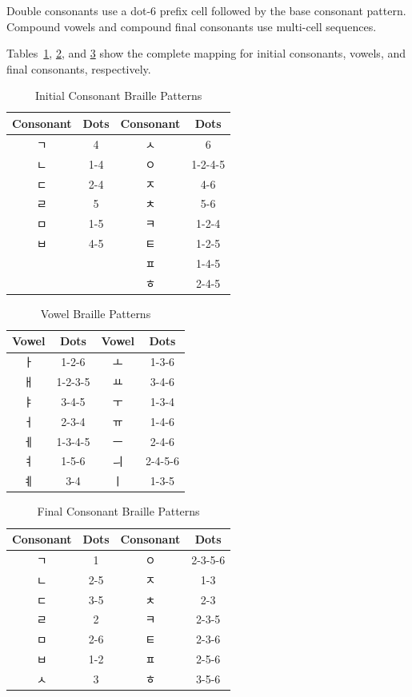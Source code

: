 \documentclass[journal]{IEEEtran}
\begin{document}
Double consonants use a dot-6 prefix cell followed by the base consonant pattern. Compound vowels and compound final consonants use multi-cell sequences.

Tables~\ref{tab:cho}, \ref{tab:jung}, and \ref{tab:jong} show the complete mapping for initial consonants, vowels, and final consonants, respectively.

\begin{table}[h]
\centering
\caption{Initial Consonant Braille Patterns}
\label{tab:cho}
\begin{tabular}{cccc}
\toprule
Consonant & Dots & Consonant & Dots \\
\midrule
{ㄱ} & 4 & {ㅅ} & 6 \\
{ㄴ} & 1-4 & {ㅇ} & 1-2-4-5 \\
{ㄷ} & 2-4 & {ㅈ} & 4-6 \\
{ㄹ} & 5 & {ㅊ} & 5-6 \\
{ㅁ} & 1-5 & {ㅋ} & 1-2-4 \\
{ㅂ} & 4-5 & {ㅌ} & 1-2-5 \\
& & {ㅍ} & 1-4-5 \\
& & {ㅎ} & 2-4-5 \\
\bottomrule
\end{tabular}
\end{table}

\begin{table}[h]
\centering
\caption{Vowel Braille Patterns}
\label{tab:jung}
\begin{tabular}{cccc}
\toprule
Vowel & Dots & Vowel & Dots \\
\midrule
{ㅏ} & 1-2-6 & {ㅗ} & 1-3-6 \\
{ㅐ} & 1-2-3-5 & {ㅛ} & 3-4-6 \\
{ㅑ} & 3-4-5 & {ㅜ} & 1-3-4 \\
{ㅓ} & 2-3-4 & {ㅠ} & 1-4-6 \\
{ㅔ} & 1-3-4-5 & {ㅡ} & 2-4-6 \\
{ㅕ} & 1-5-6 & {ㅢ} & 2-4-5-6 \\
{ㅖ} & 3-4 & {ㅣ} & 1-3-5 \\
\bottomrule
\end{tabular}
\end{table}

\begin{table}[h]
\centering
\caption{Final Consonant Braille Patterns}
\label{tab:jong}
\begin{tabular}{cccc}
\toprule
Consonant & Dots & Consonant & Dots \\
\midrule
{ㄱ} & 1 & {ㅇ} & 2-3-5-6 \\
{ㄴ} & 2-5 & {ㅈ} & 1-3 \\
{ㄷ} & 3-5 & {ㅊ} & 2-3 \\
{ㄹ} & 2 & {ㅋ} & 2-3-5 \\
{ㅁ} & 2-6 & {ㅌ} & 2-3-6 \\
{ㅂ} & 1-2 & {ㅍ} & 2-5-6 \\
{ㅅ} & 3 & {ㅎ} & 3-5-6 \\
\bottomrule
\end{tabular}
\end{table}
\end{document}
